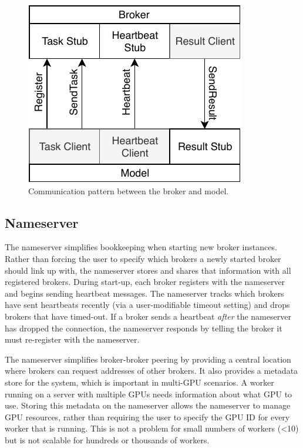 \documentclass[conference]{IEEEtran}
\begin{document}
\begin{figure}
  \centering
  \includegraphics{img/model_broker}
  \caption{Communication pattern between the broker and
    model.}\label{fig:broker-model}
\end{figure}

\subsection{Nameserver}
The nameserver simplifies bookkeeping when starting new broker instances.
Rather than forcing the user to specify which brokers a newly started broker
should link up with, the nameserver stores and shares that information with all
registered brokers. During start-up, each broker registers with the nameserver
and begins sending heartbeat messages. The nameserver tracks which brokers have
sent heartbeats recently (via a user-modifiable timeout setting) and drops
brokers that have timed-out. If a broker sends a heartbeat \emph{after} the
nameserver has dropped the connection, the nameserver responds by telling the
broker it must re-register with the nameserver.

The nameserver simplifies broker-broker peering by providing a central location
where brokers can request addresses of other brokers. It also provides a metadata
store for the system, which is important in multi-GPU scenarios. A worker running
on a server with multiple GPUs needs information about what GPU to use. Storing
this metadata on the nameserver allows the nameserver to manage GPU resources,
rather than requiring the user to specify the GPU ID for every worker that is
running. This is not a problem for small numbers of workers (<10) but is not
scalable for hundreds or thousands of workers.
\end{document}
